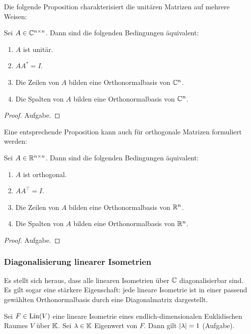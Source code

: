Die folgende Proposition charakterisiert die unitären Matrizen auf mehrere Weisen: 

\begin{propn}
	Sei $ A \in \mathbb C^{n \times n} $. Dann sind die folgenden Bedingungen äquivalent:
	\begin{enumerate}
		\item
			$ A $ ist unitär.
		\item
			$ AA^\ast = I $.
		\item
			Die Zeilen von $ A $ bilden eine Orthonormalbasis von $ \mathbb C^n $.
		\item
			Die Spalten von $ A $ bilden eine Orthonormalbasis von $ \mathbb C^n $.
	\end{enumerate}
\end{propn}
\begin{proof}
	Aufgabe. 
\end{proof}

\noindent Eine entsprechende Proposition kann auch für orthogonale Matrizen formuliert werden:

\begin{propn}
	Sei $ A \in \mathbb R^{n \times n} $. Dann sind die folgenden Bedingungen äquivalent:
	\begin{enumerate}
		\item
		$ A $ ist orthogonal.
		\item
		$ AA^\top = I $.
		\item
		Die Zeilen von $ A $ bilden eine Orthonormalbasis von $ \mathbb R^n $.
		\item
		Die Spalten von $ A $ bilden eine Orthonormalbasis von $ \mathbb R^n $.
	\end{enumerate}
\end{propn}
\begin{proof}
	Aufgabe. 
\end{proof}


\subsubsection{Diagonalisierung linearer Isometrien}

Es stellt sich heraus, dass alle linearen Isometrien über $\mathbb C$ diagonalisierbar sind. Es gilt sogar eine stärkere Eigenschaft: jede lineare Isometrie ist in einer passend gewählten Orthonormalbasis durch eine Diagonalmatrix dargestellt. 

\begin{bem}
	Sei $ F \in \operatorname{Lin}(V) $ eine lineare Isometrie eines endlich-dimensionalen Euklidischen Raumes $ V $ über $ \mathbb K $. Sei $ \lambda \in \mathbb K $ Eigenwert von $ F $. Dann gilt $ \left| \lambda \right| = 1 $ (Aufgabe). 
\end{bem}


